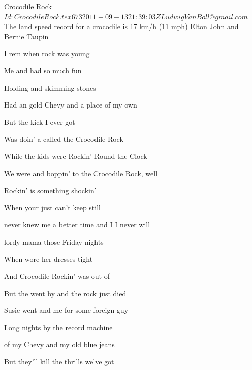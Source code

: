 \begin{SBSong}{Crocodile Rock}
  {$Id: CrocodileRock.tex 673 2011-09-13 21:39:03Z LudwigVanBoll@gmail.com $}
  {The land speed record for a crocodile is 17 km/h (11 mph)}
  {Elton John and Bernie Taupin}
  \begin{SBVerse}
    I rem when rock was young

    Me and  had so much fun

    Holding  and skimming stones

    Had an  gold Chevy and a place of my own

    But the  kick I ever got

    Was doin' a  called the Crocodile Rock

    While the  kids were Rockin' Round the Clock

    We were  and boppin' to the Crocodile Rock, well
  \end{SBVerse}
  \begin{SBChorus}
     Rockin' is something shockin'

    When your  just can't keep still

     never knew me a better time and I  I never will

     lordy mama those Friday nights

    When  wore her dresses tight

    And  Crocodile Rockin' was out of 

           
  \end{SBChorus}
  \begin{SBVerse}
    But the  went by and the rock just died

    Susie went and  me for some foreign guy

    Long nights  by the record machine

     of my Chevy and my old blue jeans

    But they'll  kill the thrills we've got


\end{SBVerse}
\end{SBSong}
